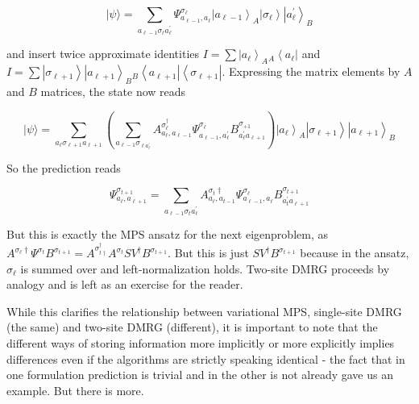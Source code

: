 \documentclass[12pt]{article}
\begin{document}
\begin{equation*}
|\psi\rangle=\sum_{a_{\ell-1} \sigma_{\ell} a_{\ell}^{\prime}} \Psi_{a_{\ell-1}, a_{\ell}}^{\sigma_{\ell}}\left|a_{\ell-1}\right\rangle_{A}\left|\sigma_{\ell}\right\rangle\left|a_{\ell}^{\prime}\right\rangle_{B} \tag{222}
\end{equation*}


and insert twice approximate identities $I=\sum\left|a_{\ell}\right\rangle_{A}{ }_{A}\left\langle a_{\ell}\right|$ and $I=\sum\left|\sigma_{\ell+1}\right\rangle\left|a_{\ell+1}\right\rangle_{B}{ }_{B}\left\langle a_{\ell+1}\right|\left\langle\sigma_{\ell+1}\right|$. Expressing the matrix elements by $A$ and $B$ matrices, the state now reads


\begin{equation*}
|\psi\rangle=\sum_{a_{\ell} \sigma_{\ell+1} a_{\ell+1}}\left(\sum_{a_{\ell-1} \sigma_{\ell a_{\ell}^{\prime}}} A_{a_{\ell}, a_{\ell-1}}^{\sigma_{\ell}^{\dagger}} \Psi_{a_{\ell-1}, a_{\ell}^{\prime}}^{\sigma_{\ell}} B_{a_{\ell}^{\prime} a_{\ell+1}}^{\sigma_{+1}}\right)\left|a_{\ell}\right\rangle_{A}\left|\sigma_{\ell+1}\right\rangle\left|a_{\ell+1}\right\rangle_{B} \tag{223}
\end{equation*}


So the prediction reads


\begin{equation*}
\Psi_{a_{\ell}, a_{\ell+1}}^{\sigma_{t+1}}=\sum_{a_{\ell-1} \sigma_{t} a_{\ell}^{\prime}} A_{a_{\ell}, a_{t-1}}^{\sigma_{t} \dagger} \Psi_{a_{\ell-1}, a_{\ell}}^{\sigma_{\ell}} B_{a_{t}^{\prime} a_{\ell+1}}^{\sigma_{t+1}} \tag{224}
\end{equation*}


But this is exactly the MPS ansatz for the next eigenproblem, as $A^{\sigma_{\ell} \dagger} \Psi^{\sigma_{t}} B^{\sigma_{t+1}}=A^{\sigma_{t \dagger}^{\dagger}} A^{\sigma_{t}} S V^{\dagger} B^{\sigma_{t+1}}$. But this is just $S V^{\dagger} B^{\sigma_{t+1}}$ because in the ansatz, $\sigma_{\ell}$ is summed over and left-normalization holds. Two-site DMRG proceeds by analogy and is left as an exercise for the reader.

While this clarifies the relationship between variational MPS, single-site DMRG (the same) and two-site DMRG (different), it is important to note that the different ways of storing information more implicitly or more explicitly implies differences even if the algorithms are strictly speaking identical - the fact that in one formulation prediction is trivial and in the other is not already gave us an example. But there is more.
\end{document}
